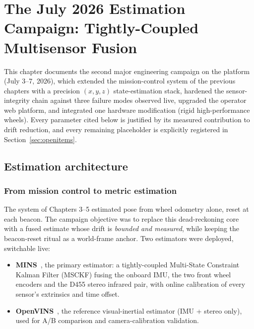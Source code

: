 \chapter{The July 2026 Estimation Campaign: Tightly-Coupled Multisensor Fusion}
\label{ch:fusion}

This chapter documents the second major engineering campaign on the platform
(July 3--7, 2026), which extended the mission-control system of the previous
chapters with a precision $(x,y,z)$ state-estimation stack, hardened the
sensor-integrity chain against three failure modes observed live, upgraded the
operator web platform, and integrated one hardware modification (rigid
high-performance wheels). Every parameter cited below is justified by its
measured contribution to drift reduction, and every remaining placeholder is
explicitly registered in Section~\ref{sec:openitems}.

\section{Estimation architecture}
\label{sec:fusionarch}

\subsection{From mission control to metric estimation}
The system of Chapters 3--5 estimated pose from wheel odometry alone, reset at
each beacon. The campaign objective was to replace this dead-reckoning core
with a fused estimate whose drift is \emph{bounded and measured}, while keeping
the beacon-reset ritual as a world-frame anchor. Two estimators were deployed,
switchable live:

\begin{itemize}
  \item \textbf{MINS}~\cite{lee2023mins,lee2025minsjfr}, the primary
        estimator: a tightly-coupled Multi-State Constraint Kalman Filter
        (MSCKF) fusing the onboard IMU, the two front wheel encoders and the
        D455 stereo infrared pair, with online calibration of every sensor's
        extrinsics and time offset.
  \item \textbf{OpenVINS}~\cite{geneva2020openvins}, the reference
        visual-inertial estimator (IMU + stereo only), used for A/B comparison
        and camera-calibration validation.
\end{itemize}


